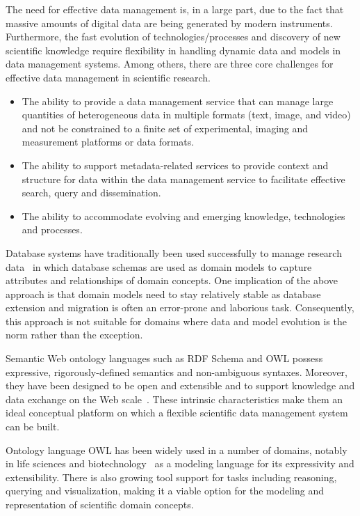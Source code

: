 \documentclass[conference,10pt]{IEEEtran}
\begin{document}
The need for effective data management is, in a large part, due to the fact that massive amounts of digital data are being generated by modern instruments. Furthermore, the fast evolution of technologies/processes and discovery of new scientific knowledge require flexibility in handling dynamic data and models in data management systems. Among others, there are three core challenges for effective data management in scientific research.

\begin{itemize}
\item The ability to provide a data management service that can manage large quantities of heterogeneous data in multiple formats (text, image, and video) and not be constrained to a finite set of experimental, imaging and measurement platforms or data formats.

\item The ability to support metadata-related services to provide context and structure for data within the data management service to facilitate effective search, query and dissemination.

\item The ability to accommodate evolving and emerging knowledge, technologies and processes.
\end{itemize}

Database systems have traditionally been used successfully to manage research data~\cite{brm2007} in which database schemas are used as domain models to capture attributes and relationships of domain concepts. One implication of the above approach is that domain models need to stay relatively stable as database extension and migration is often an error-prone and laborious task. Consequently, this approach is not suitable for domains where data and model evolution is the norm rather than the exception.

Semantic Web ontology languages such as RDF Schema and OWL possess expressive, rigorously-defined semantics and non-ambiguous syntaxes. Moreover, they have been designed to be open and extensible and to support knowledge and data exchange on the Web scale~\cite{linkeddata,aue07dbpedia}. These intrinsic characteristics make them an ideal conceptual platform on which a flexible scientific data management system can be built.

Ontology language OWL has been widely used in a number of domains, notably in life sciences and biotechnology~\cite{journals/bib/RuttenbergRSM09,citeulike:1882392,citeulike:212874} as a modeling language for its expressivity and extensibility. There is also growing tool support for tasks including reasoning, querying and visualization, making it a viable option for the modeling and representation of scientific domain concepts.
\end{document}
